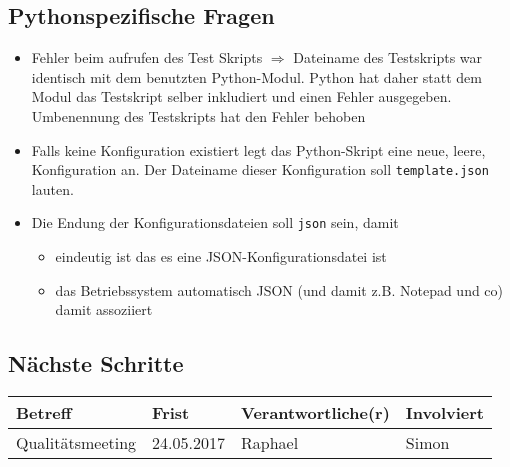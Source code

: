 \documentclass{scrartcl}
\begin{document}
\subsection{Pythonspezifische Fragen}
\begin{itemize}
    \item Fehler beim aufrufen des Test Skripts $\Rightarrow$ Dateiname des Testskripts war identisch mit dem benutzten Python-Modul. Python hat daher statt dem Modul das Testskript selber inkludiert und einen Fehler ausgegeben. Umbenennung des Testskripts hat den Fehler behoben
    \item Falls keine Konfiguration existiert legt das Python-Skript eine neue, leere, Konfiguration an. Der Dateiname dieser Konfiguration soll \texttt{template.json} lauten.
    \item Die Endung der Konfigurationsdateien soll \texttt{json} sein, damit 
    \begin{itemize}
        \item eindeutig ist das es eine JSON-Konfigurationsdatei ist
        \item das Betriebssystem automatisch JSON (und damit z.B. Notepad und co) damit assoziiert
    \end{itemize}
\end{itemize}
\subsection{Nächste Schritte}
\begin{tabular}{L{.249} L{.2} L{.25} L{.25}}
Betreff & Frist & Verantwortliche(r) & Involviert\\\hline
Qualitätsmeeting & 24.05.2017&Raphael &Simon \\
\end{tabular}
\end{document}
